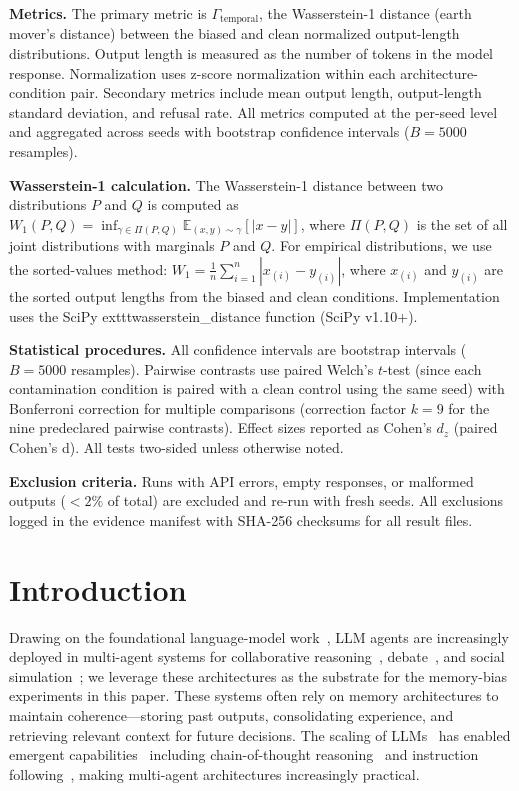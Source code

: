 \documentclass[11pt]{article}
\begin{document}
\textbf{Metrics.} The primary metric is $\Gamma_{\text{temporal}}$, the Wasserstein-1 distance (earth mover's distance) between the biased and clean normalized output-length distributions. Output length is measured as the number of tokens in the model response. Normalization uses z-score normalization within each architecture-condition pair. Secondary metrics include mean output length, output-length standard deviation, and refusal rate. All metrics computed at the per-seed level and aggregated across seeds with bootstrap confidence intervals ($B=5000$ resamples).

\textbf{Wasserstein-1 calculation.} The Wasserstein-1 distance between two distributions $P$ and $Q$ is computed as $W_1(P,Q) = \inf_{\gamma \in \Pi(P,Q)} \mathbb{E}_{(x,y)\sim\gamma}[|x-y|]$, where $\Pi(P,Q)$ is the set of all joint distributions with marginals $P$ and $Q$. For empirical distributions, we use the sorted-values method: $W_1 = \frac{1}{n} \sum_{i=1}^{n} |x_{(i)} - y_{(i)}|$, where $x_{(i)}$ and $y_{(i)}$ are the sorted output lengths from the biased and clean conditions. Implementation uses the SciPy 	exttt{wasserstein\_distance} function (SciPy v1.10+).

\textbf{Statistical procedures.} All confidence intervals are bootstrap intervals ($B=5000$ resamples). Pairwise contrasts use paired Welch's $t$-test (since each contamination condition is paired with a clean control using the same seed) with Bonferroni correction for multiple comparisons (correction factor $k=9$ for the nine predeclared pairwise contrasts). Effect sizes reported as Cohen's $d_z$ (paired Cohen's d). All tests two-sided unless otherwise noted.

\textbf{Exclusion criteria.} Runs with API errors, empty responses, or malformed outputs ($<2\%$ of total) are excluded and re-run with fresh seeds. All exclusions logged in the evidence manifest with SHA-256 checksums for all result files.

\section{Introduction}
\label{sec:intro}

Drawing on the foundational language-model work~\cite{brown2020language,touvron2023llama,zhao2023survey}, LLM agents are increasingly deployed in multi-agent systems for collaborative reasoning~\cite{du2024improving}, debate~\cite{li2023camel,liang2023multiagent}, and social simulation~\cite{park2023generative}; we leverage these architectures as the substrate for the memory-bias experiments in this paper. These systems often rely on memory architectures to maintain coherence---storing past outputs, consolidating experience, and retrieving relevant context for future decisions. The scaling of LLMs~\cite{kaplan2020scaling} has enabled emergent capabilities~\cite{wei2022emergent} including chain-of-thought reasoning~\cite{wei2022chain} and instruction following~\cite{ouyang2022training}, making multi-agent architectures increasingly practical.
\end{document}
